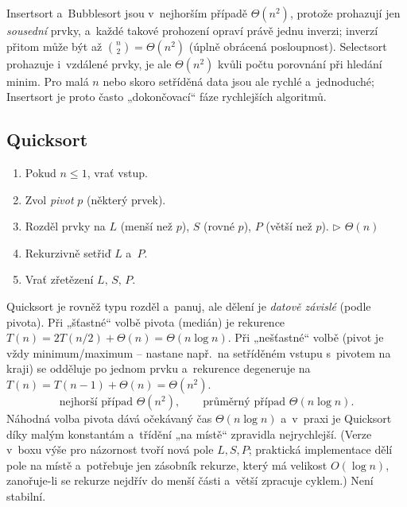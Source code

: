 \documentclass[11pt,a4paper]{article}
\newcommand{\cmt}[1]{\hfill{\footnotesize\itshape\textcolor{black!55}{$\triangleright$ #1}}}
\begin{document}
\begin{intuice}
Insertsort a~Bubblesort jsou v~nejhorším případě $\Theta(n^2)$, protože prohazují jen \emph{sousední} prvky, a~každé takové prohození opraví právě jednu inverzi; inverzí přitom může být až $\binom n2=\Theta(n^2)$ (úplně obrácená posloupnost). Selectsort prohazuje i~vzdálené prvky, je ale $\Theta(n^2)$ kvůli počtu porovnání při hledání minim. Pro malá $n$ nebo skoro setříděná data jsou ale rychlé a~jednoduché; Insertsort je proto často „dokončovací`` fáze rychlejších algoritmů.
\end{intuice}

\subsection{Quicksort}

\begin{algo}
\begin{enumerate}
  \item Pokud $n\le1$, vrať vstup.
  \item Zvol \emph{pivot} $p$ (některý prvek).
  \item Rozděl prvky na $L$ (menší než $p$), $S$ (rovné $p$), $P$ (větší než $p$). \cmt{$\Theta(n)$}
  \item Rekurzivně setřiď $L$ a~$P$.
  \item Vrať zřetězení $L,\,S,\,P$.
\end{enumerate}
\end{algo}

Quicksort je rovněž typu rozděl a~panuj, ale dělení je \emph{datově závislé} (podle pivota). Při „šťastné`` volbě pivota (medián) je rekurence $T(n)=2T(n/2)+\Theta(n)=\Theta(n\log n)$. Při „nešťastné`` volbě (pivot je vždy minimum/maximum -- nastane např.\ na setříděném vstupu s~pivotem na kraji) se odděluje po jednom prvku a~rekurence degeneruje na $T(n)=T(n-1)+\Theta(n)=\Theta(n^2)$.
\[
\text{nejhorší případ } \Theta(n^2),\qquad \text{průměrný případ } \Theta(n\log n).
\]
Náhodná volba pivota dává očekávaný čas $\Theta(n\log n)$ a~v~praxi je Quicksort díky malým konstantám a~třídění „na místě`` zpravidla nejrychlejší. (Verze v~boxu výše pro názornost tvoří nová pole $L,S,P$; praktická implementace dělí pole na místě a~potřebuje jen zásobník rekurze, který má velikost $O(\log n)$, zanořuje-li se rekurze nejdřív do menší části a~větší zpracuje cyklem.) Není stabilní.
\end{document}
